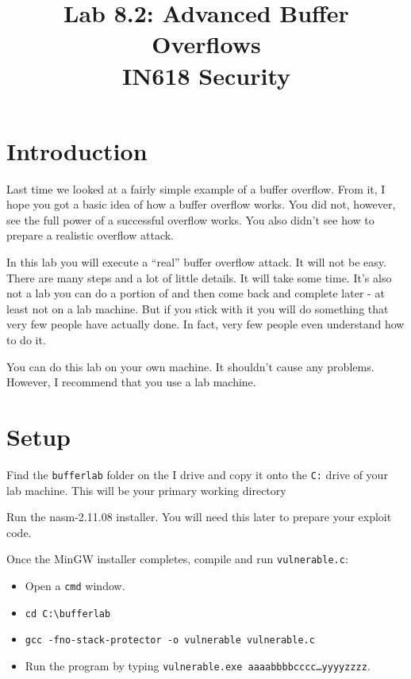 \documentclass{article}
\begin{document}
\title{ Lab 8.2: Advanced Buffer Overflows\\ IN618 Security}
\maketitle

\section*{Introduction}
Last time we looked at a fairly simple example of a buffer overflow.  From it, I hope
you got a basic idea of how a buffer overflow works. You did not, however, see the full
power of a successful overflow works.  You also didn't see how to prepare a realistic 
overflow attack.

In this lab you will execute a ``real'' buffer overflow attack.  It will not be easy.
There are many steps and a lot of little details.  It will take some time.  It's also not
a lab you can do a portion of and then come back and complete later - at least not on a lab
machine.  But if you stick with it you will do something that very few people have actually done.
In fact, very few people even understand how to do it.

You can do this lab on your own machine.  It shouldn't cause any problems.  However, I recommend that 
you use a lab machine.

\section{Setup}

Find the \texttt{bufferlab} folder on the I drive and copy it onto the \texttt{C:} drive of your lab machine. This will be your primary working directory


Run the nasm-2.11.08 installer.  You will need this later to prepare your exploit code.

Once the MinGW installer completes, compile and run \texttt{vulnerable.c}:
\begin{itemize}
	\item Open a \texttt{cmd} window.
	\item \texttt{cd C:\textbackslash{}bufferlab}
	\item \texttt{gcc -fno-stack-protector  -o vulnerable vulnerable.c}
	\item Run the program by typing \texttt{vulnerable.exe aaaabbbbcccc\ldots yyyyzzzz}.
	\end{itemize}
\end{document}

